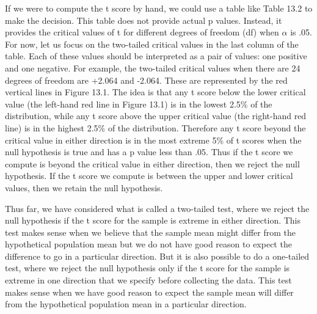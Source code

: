 If we were to compute the t score by hand, we could use a table like Table 13.2 to make the decision. This table does not provide actual p values. Instead, it provides the critical values of t for different degrees of freedom (df) when $\alpha$ is .05. For now, let us focus on the two-tailed critical values in the last column of the table. Each of these values should be interpreted as a pair of values: one positive and one negative. For example, the two-tailed critical values when there are 24 degrees of freedom are +2.064 and -2.064. These are represented by the red vertical lines in Figure 13.1. The idea is that any t score below the lower critical value (the left-hand red line in Figure 13.1) is in the lowest 2.5\% of the distribution, while any t score above the upper critical value (the right-hand red line) is in the highest 2.5\% of the distribution. Therefore any t score beyond the critical value in either direction is in the most extreme 5\% of t scores when the null hypothesis is true and has a p value less than .05. Thus if the t score we compute is beyond the critical value in either direction, then we reject the null hypothesis. If the t score we compute is between the upper and lower critical values, then we retain the null hypothesis.


Thus far, we have considered what is called a two-tailed test, where we reject the null hypothesis if the t score for the sample is extreme in either direction. This test makes sense when we believe that the sample mean might differ from the hypothetical population mean but we do not have good reason to expect the difference to go in a particular direction. But it is also possible to do a one-tailed test, where we reject the null hypothesis only if the t score for the sample is extreme in one direction that we specify before collecting the data. This test makes sense when we have good reason to expect the sample mean will differ from the hypothetical population mean in a particular direction.


